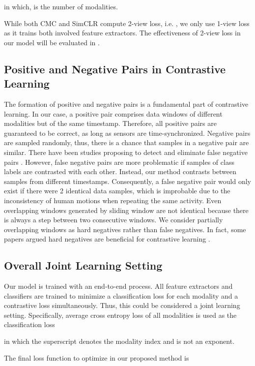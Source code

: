 \documentclass[conference]{IEEEtran}
\begin{document}
in which,  is the number of modalities.

While both CMC and SimCLR compute 2-view loss, i.e. , we only use 1-view loss as it trains both involved feature extractors. The effectiveness of 2-view loss in our model will be evaluated in .

\subsection{Positive and Negative Pairs in Contrastive Learning}
The formation of positive and negative pairs is a fundamental part of contrastive learning. In our case, a positive pair comprises data windows of different modalities but of the same timestamp. Therefore, all positive pairs are guaranteed to be correct, as long as sensors are time-synchronized. Negative pairs are sampled randomly, thus, there is a chance that samples in a negative pair are similar. There have been studies proposing to detect and eliminate false negative pairs \cite{Huynh2022,Wang2023}. However, false negative pairs are more problematic if samples of class labels are contrasted with each other. Instead, our method contrasts between samples from different timestamps. Consequently, a false negative pair would only exist if there were 2 identical data samples, which is improbable due to the inconsistency of human motions when repeating the same activity. Even overlapping windows generated by sliding window are not identical because there is always a step between two consecutive windows. We consider partially overlapping windows as hard negatives rather than false negatives. In fact, some papers argued hard negatives are beneficial for contrastive learning \cite{Robinson2021,Deldari2022}.

\subsection{Overall Joint Learning Setting}
Our model is trained with an end-to-end process. All feature extractors and classifiers are trained to minimize a classification loss for each modality and a contrastive loss simultaneously. Thus, this could be considered a joint learning setting. Specifically, average cross entropy loss of all modalities is used as the classification loss

in which the superscript  denotes the modality index and is not an exponent.

The final loss function to optimize in our proposed method is
\end{document}
